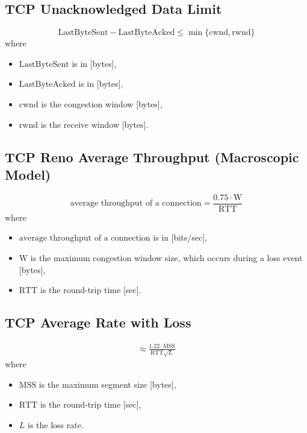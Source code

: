 \subsection{TCP Unacknowledged Data Limit}
\begin{equation*}
    \text{LastByteSent} - \text{LastByteAcked} \leq \min\{\text{cwnd}, \text{rwnd}\}
\end{equation*}
where
\begin{itemize}
    \item $\text{LastByteSent}$ is in [bytes],
    \item $\text{LastByteAcked}$ is in [bytes],
    \item $\text{cwnd}$ is the congestion window [bytes],
    \item $\text{rwnd}$ is the receive window [bytes].
\end{itemize}
\subsection{TCP Reno Average Throughput (Macroscopic Model)}
\begin{equation*}
    \text{average throughput of a connection} = \frac{0.75 \cdot \text{W}}{\text{RTT}}
\end{equation*}
where
\begin{itemize}
    \item $\text{average throughput of a connection}$ is in [bits/sec],
    \item $\text{W}$ is the maximum congestion window size, which occurs during a loss event [bytes],
    \item $\text{RTT}$ is the round-trip time [sec].
\end{itemize}
\subsection{TCP Average Rate with Loss}
\begin{align*}
    \approx \frac{1.22 \cdot \text{MSS}}{\text{RTT} \sqrt{L}}
\end{align*}
where
\begin{itemize}
    \item $\text{MSS}$ is the maximum segment size [bytes],
    \item $\text{RTT}$ is the round-trip time [sec],
    \item $L$ is the loss rate.
\end{itemize}